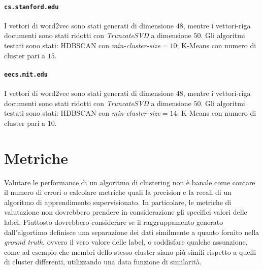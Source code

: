 \paragraph{\texttt{cs.stanford.edu}} I vettori di word2vec sono stati generati di dimensione $48$, mentre i vettori-riga documenti sono stati ridotti con \textit{TruncateSVD} a dimensione $50$. Gli algoritmi testati sono stati: HDBSCAN con \textit{min-cluster-size}$=10$; K-Means con numero di cluster pari a $15$. 

\paragraph{\texttt{eecs.mit.edu}} I vettori di word2vec sono stati generati di dimensione $48$, mentre i vettori-riga documenti sono stati ridotti con \textit{TruncateSVD} a dimensione $50$. Gli algoritmi testati sono stati: HDBSCAN con \textit{min-cluster-size}$=14$; K-Means con numero di cluster pari a $10$. 

\section{Metriche}
Valutare le performance di un algoritmo di clustering non è banale come contare il numero di errori o calcolare metriche quali la precision e la recall di un algoritmo di apprendimento supervisionato. In particolare, le metriche di valutazione non dovrebbero prendere in considerazione gli specifici valori delle label. Piuttosto dovrebbero considerare se il raggruppamento generato dall'algortimo definisce una separazione dei dati similmente a quanto fornito nella \textit{ground truth}, ovvero il vero valore delle label, o soddisfare qualche assunzione, come ad esempio che membri dello stesso cluster siano più simili rispetto a quelli di cluster differenti, utilizzando una data funzione di similarità.

